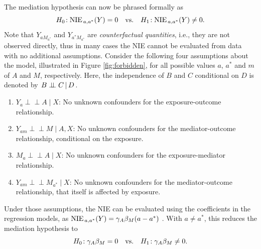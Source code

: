 \documentclass[ejs, twoside]{imsart}
\theoremstyle{plain}
\theoremstyle{remark}
\newcommand{\fullstop}{\text{.}}
\newcommand{\indep}{\perp \!\!\! \perp}
\newcommand{\cond}[2]{\left.{#1}\,\middle|\,{#2}\right.}
\numberwithin{equation}{section}
\numberwithin{table}{section}
\numberwithin{figure}{section}
\let\originalleft\left
\let\originalright\right
\renewcommand{\left}{\mathopen{}\mathclose\bgroup\originalleft}
\renewcommand{\right}{\aftergroup\egroup\originalright}
\begin{document}
The mediation hypothesis can now be phrased formally as
\[\hypothesis{\NIE = 0}{\NIE \neq 0} \fullstop\]
Note that \(Y_{aM_{a^*}}\) and \(Y_{a^*M_{a^*}}\) are \emph{counterfactual quantities}, i.e., they are not observed directly, thus in many cases the NIE cannot be evaluated from data with no additional assumptions. Consider the following four assumptions about the model, illustrated in Figure \ref{fig:forbidden}, for all possible values \(a\), \(a^*\) and \(m\) of \(A\) and \(M\), respectively. Here, the independence of $B$ and $C$ conditional on $D$ is denoted by $\cond{B \indep C}{D}$.
\begin{enumerate}[label = (\roman*)] \label{assumptions}
	\item $Y_a \indep  A \mid X$: No unknown confounders for the exposure-outcome relationship.
	\item $Y_{am} \indep M \mid  A,X  $: No unknown confounders for the mediator-outcome relationship, conditional on the exposure.
	\item $M_a \indep A \mid X$: No unknown confounders for the exposure-mediator relationship.
	\item $Y_{am} \indep M_{a^*} \mid X$: No unknown confounders for the mediator-outcome relationship, that itself is affected by exposure.
\end{enumerate}
 Under those assumptions, the NIE can be evaluated using the coefficients in the regression models, as \(\NIE = \regcoefx{1} \regcoefx{2} \left( a - a^* \right) \) \citep{pearl_direct_2001, vanderweele_three-way_2013, barfield_testing_2017}. With \(a \neq a^*\), this reduces the mediation hypothesis to
 \begin{equation} \label{eq:medhyp}
 	\hypothesis{
 		\regcoefx{1} \regcoefx{2} = 0
 	}{
 		\regcoefx{1} \regcoefx{2} \neq 0
 	} \fullstop
 \end{equation}
\end{document}

